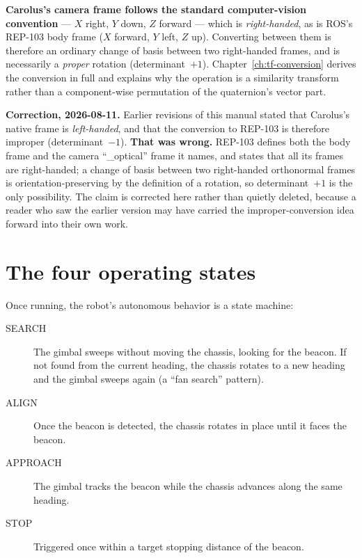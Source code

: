 \documentclass[11pt]{report}
\newenvironment{warningbox}%
  {\begin{lrbox}{\warnbox}\begin{minipage}{0.90\textwidth}}%
  {\end{minipage}\end{lrbox}%
   \begin{center}\fcolorbox{black}{codebg}{\usebox{\warnbox}}\end{center}}
\begin{document}
\textbf{Carolus's camera frame follows the standard computer-vision
convention} --- $X$ right, $Y$ down, $Z$ forward --- which is
\emph{right-handed}, as is ROS's REP-103 body frame ($X$ forward, $Y$ left,
$Z$ up). Converting between them is therefore an ordinary change of basis
between two right-handed frames, and is necessarily a \emph{proper} rotation
(determinant~$+1$). Chapter~\ref{ch:tf-conversion} derives the conversion in
full and explains why the operation is a similarity transform rather than a
component-wise permutation of the quaternion's vector part.

\begin{warningbox}
\textbf{Correction, 2026-08-11.} Earlier revisions of this manual stated that
Carolus's native frame is \emph{left-handed}, and that the conversion to
REP-103 is therefore improper (determinant~$-1$). \textbf{That was wrong.}
REP-103 defines both the body frame and the camera ``\_optical'' frame it
names, and states that all its frames are right-handed; a change of basis
between two right-handed orthonormal frames is orientation-preserving by the
definition of a rotation, so determinant~$+1$ is the only possibility. The
claim is corrected here rather than quietly deleted, because a reader who saw
the earlier version may have carried the improper-conversion idea forward
into their own work.
\end{warningbox}

\section{The four operating states}

Once running, the robot's autonomous behavior is a state machine:

\begin{description}
  \item[SEARCH] The gimbal sweeps without moving the chassis, looking for
  the beacon. If not found from the current heading, the chassis rotates to
  a new heading and the gimbal sweeps again (a ``fan search'' pattern).
  \item[ALIGN] Once the beacon is detected, the chassis rotates in place
  until it faces the beacon.
  \item[APPROACH] The gimbal tracks the beacon while the chassis advances
  along the same heading.
  \item[STOP] Triggered once within a target stopping distance of the
  beacon.
\end{description}
\end{document}
